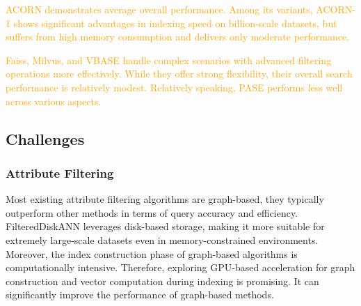 \documentclass[sigconf, nonacm]{acmart}
\begin{document}
{\textcolor{orange}{
ACORN demonstrates average overall performance. Among its variants, ACORN-1 shows significant advantages in indexing speed on billion-scale datasets, but suffers from high memory consumption and delivers only moderate performance.}

\textcolor{orange}{
Faiss, Milvus, and VBASE handle complex scenarios with advanced filtering operations more effectively. While they offer strong flexibility, their overall search performance is relatively modest. Relatively speaking, PASE performs less well across various aspects.}
	
	\subsection{Challenges}
	\subsubsection{\textbf{Attribute Filtering}}
	Most existing attribute filtering algorithms are graph-based, they typically outperform other methods in terms of query accuracy and efficiency. FilteredDiskANN leverages disk-based storage, making it more suitable for extremely large-scale datasets even in memory-constrained environments. Moreover, the index construction phase of graph-based algorithms is computationally intensive. Therefore, exploring GPU-based acceleration for graph construction and vector computation during indexing is promising. It can significantly improve the performance of graph-based methods.
	
}
\end{document}
